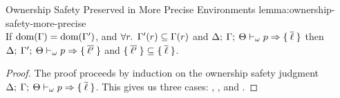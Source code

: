 \begin{oxlemma}{Ownership Safety Preserved in More Precise Environments}
  {lemma:ownership-safety-more-precise}\hfill\\ If $\textrm{dom}(\Gamma) =
  \textrm{dom}(\Gamma^\prime)$, and $\forall r.$ $\Gamma^\prime(r)
  \subseteq \Gamma(r)$ and
  $\Delta; \: \Gamma; \: \Theta \vdash_{\omega} p \Rightarrow 
    \{ \: \overline{\ell} \: \}
  $
  then
  $\Delta; \: \Gamma^\prime; \: \Theta \vdash_{\omega} p \Rightarrow 
    \{ \: \overline{\ell^\prime} \: \}
  $ and
  $\{ \: \overline{\ell^\prime} \: \} \subseteq \{ \: \overline{\ell} \: \}$.
\end{oxlemma}

\begin{proof}
  The proof proceeds by induction on the ownership safety judgment
  $\Delta; \: \Gamma; \: \Theta \vdash_{\omega} p \Rightarrow 
    \{ \: \overline{\ell} \: \}
  $. This gives us three cases: , , and
  .

  \vspace{1em}
  \noindent \framebox[\textwidth]{
    \figuresize
    \begin{mathpar}
      \OSafePlace
    \end{mathpar}
  }
  \vspace{1em}


\end{proof}
